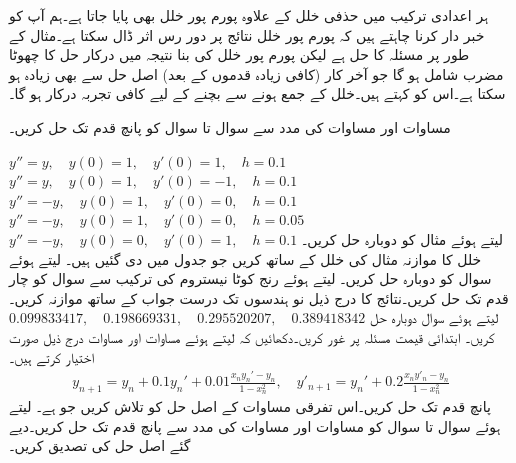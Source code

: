 ہر اعدادی  ترکیب میں حذفی خلل کے علاوہ   پورم پور خلل بھی پایا جاتا ہے۔ہم آپ کو خبر دار کرنا چاہتے ہیں کہ  پورم پور  خلل نتائج پر دور رس اثر ڈال سکتا ہے۔مثال کے طور پر مسئلہ  کا حل  ہے لیکن پورم پور خلل کی بنا نتیجہ میں  درکار حل  کا چھوٹا مضرب  شامل ہو گا جو آخر کار (کافی زیادہ قدموں کے بعد) اصل حل سے بھی زیادہ ہو سکتا ہے۔اس کو  کہتے ہیں۔خلل کے جمع ہونے سے بچنے کے لیے کافی تجربہ درکار ہو گا۔


مساوات  اور مساوات  کی مدد سے  سوال  تا سوال  کو پانچ قدم تک حل کریں۔

\quad
$y''=y,\quad y(0)=1,\quad y'(0)=1,\quad h=0.1$
\quad
$y''=y,\quad y(0)=1,\quad y'(0)=-1,\quad h=0.1$
\quad
$y''=-y,\quad y(0)=1,\quad y'(0)=0,\quad h=0.1$
\quad
$y''=-y,\quad y(0)=1,\quad y'(0)=0,\quad h=0.05$
\quad
$y''=-y,\quad y(0)=0,\quad y'(0)=1,\quad h=0.1$
\quad
{} لیتے ہوئے مثال  کو دوبارہ حل کریں۔خلل کا موازنہ مثال  کی خلل کے ساتھ کریں جو جدول  میں دی گئیں ہیں۔ 
\quad
{} لیتے ہوئے سوال  کو دوبارہ حل کریں۔
\quad
{} لیتے ہوئے رنج کوٹا نیستروم کی ترکیب سے سوال  کو چار قدم تک حل کریں۔نتائج کا درج ذیل نو ہندسوں تک درست جواب کے ساتھ موازنہ کریں۔\\
$\num{0.099833417},\quad \num{0.198669331},\quad \num{0.295520207},\quad \num{0.389418342}$
\quad
{} لیتے ہوئے سوال  دوبارہ حل کریں۔
\quad
ابتدائی قیمت مسئلہ  پر غور کریں۔دکھائیں کہ  لیتے ہوئے مساوات  اور مساوات  درج ذیل صورت اختیار کرتے ہیں۔
\begin{align*}
y_{n+1}=y_n+0.1y_n'+0.01\frac{x_ny_n'-y_n}{1-x^2_n},\quad y'_{n+1}=y_n'+0.2\frac{x_ny'_n-y_n}{1-x^2_n}
\end{align*}
پانچ قدم تک حل کریں۔اس تفرقی مساوات کے  اصل حل کو تلاش کریں جو  ہے۔
 لیتے ہوئے سوال  تا سوال  کو مساوات  اور مساوات  کی مدد سے پانچ قدم تک حل کریں۔دیے گئے اصل حل کی تصدیق کریں۔

